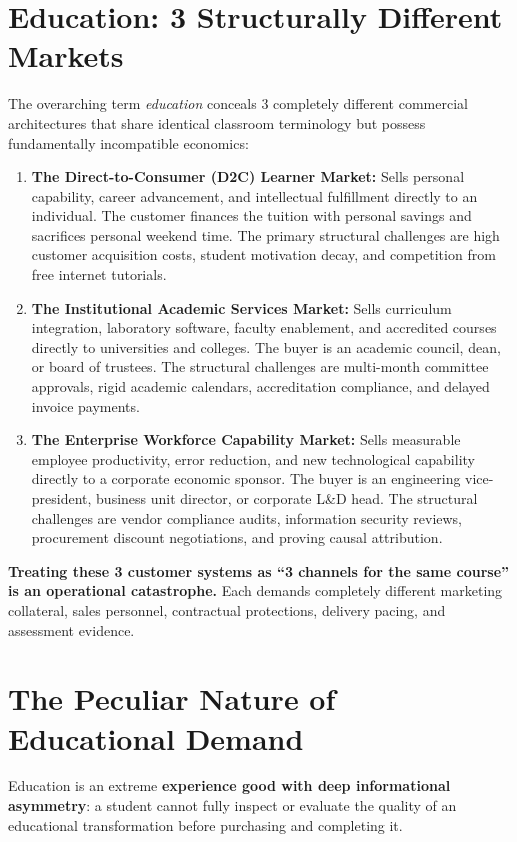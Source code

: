 \section{Education: 3 Structurally Different Markets}

The overarching term \textit{education} conceals 3 completely different commercial architectures that share identical classroom terminology but possess fundamentally incompatible economics:

\begin{enumerate}[leftmargin=14pt,itemsep=3pt,topsep=2pt]
  \item \textbf{The Direct-to-Consumer (D2C) Learner Market:} Sells personal capability, career advancement, and intellectual fulfillment directly to an individual. The customer finances the tuition with personal savings and sacrifices personal weekend time. The primary structural challenges are high customer acquisition costs, student motivation decay, and competition from free internet tutorials.
  \item \textbf{The Institutional Academic Services Market:} Sells curriculum integration, laboratory software, faculty enablement, and accredited courses directly to universities and colleges. The buyer is an academic council, dean, or board of trustees. The structural challenges are multi-month committee approvals, rigid academic calendars, accreditation compliance, and delayed invoice payments.
  \item \textbf{The Enterprise Workforce Capability Market:} Sells measurable employee productivity, error reduction, and new technological capability directly to a corporate economic sponsor. The buyer is an engineering vice-president, business unit director, or corporate L\&D head. The structural challenges are vendor compliance audits, information security reviews, procurement discount negotiations, and proving causal attribution.
\end{enumerate}

\textbf{Treating these 3 customer systems as ``3 channels for the same course'' is an operational catastrophe.} Each demands completely different marketing collateral, sales personnel, contractual protections, delivery pacing, and assessment evidence.

\section{The Peculiar Nature of Educational Demand}

Education is an extreme \textbf{experience good with deep informational asymmetry}: a student cannot fully inspect or evaluate the quality of an educational transformation before purchasing and completing it.

